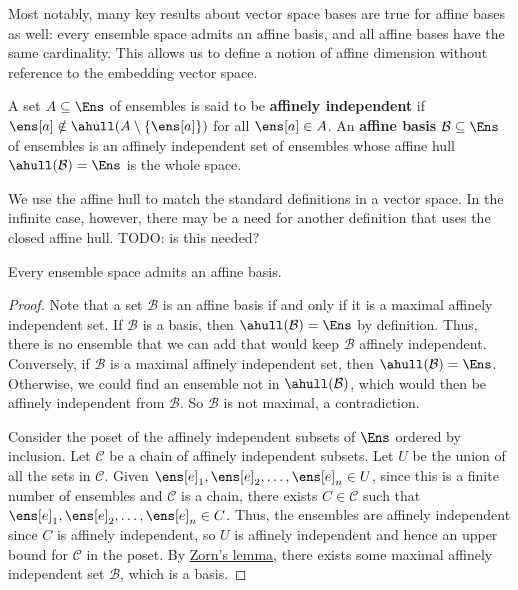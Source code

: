 Most notably, many key results about vector space bases are true for affine bases as well: every ensemble space admits an affine basis, and all affine bases have the same cardinality. This allows us to define a notion of affine dimension without reference to the embedding vector space.

\begin{mathSection}
\begin{defn}
	A set $A \subseteq \Ens$ of ensembles is said to be \textbf{affinely independent} if $\ens[a]\notin\ahull(A \setminus \{\ens[a]\})$ for all $\ens[a] \in A$. An \textbf{affine basis} $\mathcal{B} \subseteq \Ens$ of ensembles is an affinely independent set of ensembles whose affine hull $\ahull(\mathcal{B}) = \Ens$ is the whole space.
\end{defn}

\begin{remark}
	We use the affine hull to match the standard definitions in a vector space. In the infinite case, however, there may be a need for another definition that uses the closed affine hull.
	TODO: is this needed?
\end{remark}

\begin{thrm}
	Every ensemble space admits an affine basis.
\end{thrm}

\begin{proof}
	Note that a set $\mathcal{B}$ is an affine basis if and only if it is a maximal affinely independent set. If $\mathcal{B}$ is a basis, then $\ahull(\mathcal{B}) = \Ens$ by definition. Thus, there is no ensemble that we can add that would keep $\mathcal{B}$ affinely independent. Conversely, if $\mathcal{B}$ is a maximal affinely independent set, then $\ahull(\mathcal{B}) = \Ens$. Otherwise, we could find an ensemble not in $\ahull(\mathcal{B})$, which would then be affinely independent from $\mathcal{B}$. So $\mathcal{B}$ is not maximal, a contradiction.
	
	Consider the poset of the affinely independent subsets of $\Ens$ ordered by inclusion. Let $\mathcal{C}$ be a chain of affinely independent subsets. Let $U$ be the union of all the sets in $\mathcal{C}$. Given $\ens[e]_1, \ens[e]_2, \ldots, \ens[e]_n \in U$, since this is a finite number of ensembles and $\mathcal{C}$ is a chain, there exists $C \in \mathcal{C}$ such that $\ens[e]_1, \ens[e]_2, \ldots, \ens[e]_n \in C$. Thus, the ensembles are affinely independent since $C$ is affinely independent, so $U$ is affinely independent and hence an upper bound for $\mathcal{C}$ in the poset. By \href{https://en.wikipedia.org/wiki/Zorn's_lemma}{Zorn's lemma}, there exists some maximal affinely independent set $\mathcal{B}$, which is a basis.
\end{proof}


\end{mathSection}
